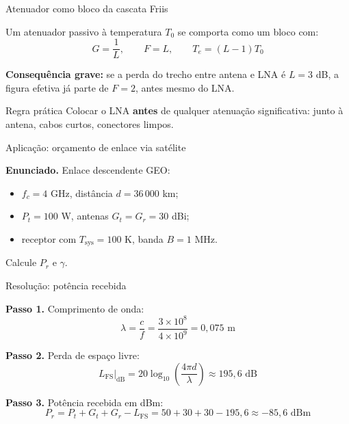 
\begin{frame}{Atenuador como bloco da cascata Friis}

Um atenuador passivo à temperatura $T_0$ se comporta como um bloco com:
\[
G = \frac{1}{L}, \qquad F = L, \qquad T_e = (L - 1) T_0
\]

\textbf{Consequência grave:} se a perda do trecho entre antena e LNA é $L = 3$ dB, a figura efetiva já parte de $F = 2$, antes mesmo do LNA.

\vspace{0.3cm}

\begin{block}{Regra prática}
Colocar o LNA \textbf{antes} de qualquer atenuação significativa: junto à antena, cabos curtos, conectores limpos.
\end{block}

\end{frame}


\begin{frame}{Aplicação: orçamento de enlace via satélite}

\textbf{Enunciado.} Enlace descendente GEO:
\begin{itemize}
\item $f_c = 4$ GHz, distância $d = 36\,000$ km;
\item $P_t = 100$ W, antenas $G_t = G_r = 30$ dBi;
\item receptor com $T_{\text{sys}} = 100$ K, banda $B = 1$ MHz.
\end{itemize}
Calcule $P_r$ e $\gamma$.

\begin{center}
\end{center}

\end{frame}


\begin{frame}{Resolução: potência recebida}

\textbf{Passo 1.} Comprimento de onda:
\[
\lambda = \frac{c}{f} = \frac{3\times 10^{8}}{4\times 10^{9}} = 0{,}075 \text{ m}
\]

\textbf{Passo 2.} Perda de espaço livre:
\[
L_{\text{FS}}|_{\text{dB}} = 20\log_{10}\!\left(\frac{4\pi d}{\lambda}\right) \approx 195{,}6 \text{ dB}
\]

\textbf{Passo 3.} Potência recebida em dBm:
\[
P_r = P_t + G_t + G_r - L_{\text{FS}} = 50 + 30 + 30 - 195{,}6 \approx -85{,}6 \text{ dBm}
\]

\end{frame}

